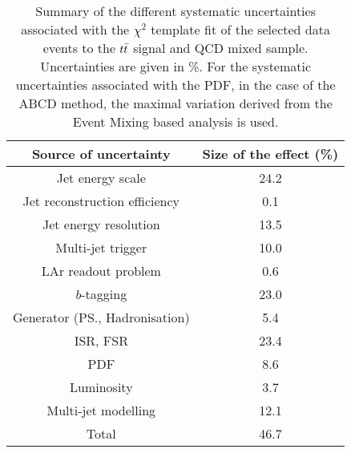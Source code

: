     \begin{table}[!h]
    \begin{center}
      \begin{tabular}{c|c}
          \hline
              \hline
              Source of uncertainty            &  Size of the effect (\%)\\
              \hline
              Jet energy scale              &          24.2    \\
              Jet reconstruction efficiency &           0.1    \\
              Jet energy resolution         &          13.5    \\
              Multi-jet trigger             &          10.0    \\
              LAr readout problem           &           0.6    \\
              $b$-tagging                   &          23.0    \\
              Generator (PS., Hadronisation)&           5.4    \\
              ISR, FSR                      &          23.4    \\
              PDF                           &           8.6    \\
              Luminosity                    &           3.7    \\
              Multi-jet modelling           &          12.1    \\
              \hline
              \hline
              Total                         &          46.7    \\
              \hline
              \hline

              \end{tabular}
              \end{center}
               \caption{Summary of the different systematic uncertainties associated with the $\chi^2$
                template fit of the selected data events to the $t\bar{t}$ signal and \mj
                 QCD mixed sample. Uncertainties are given in \%. For the systematic uncertainties associated with the PDF, in the case of the ABCD method, the maximal variation derived from the Event Mixing based analysis is used.}
                   \label{tab:finaluncertainties}
                   \end{table}

